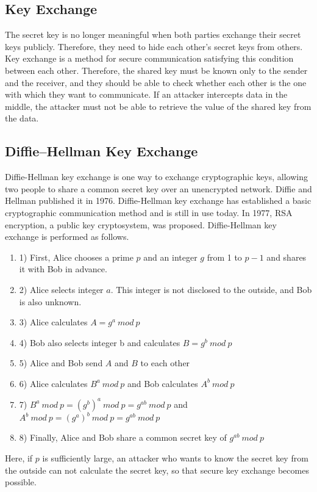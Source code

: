 \documentclass[a4paper]{article}
\begin{document}
\subsection{Key Exchange}
The secret key is no longer meaningful when both parties exchange their secret keys publicly.
Therefore, they need to hide each other's secret keys from others. Key exchange is a method for secure communication satisfying this condition between each other. Therefore, the shared key must be known only to the sender and the receiver, and they should be able to check whether each other is the one with which they want to communicate. If an attacker intercepts data in the middle, the attacker must not be able to retrieve the value of the shared key from the data.

\subsection{Diffie–Hellman Key Exchange}
Diffie-Hellman key exchange \cite{diffie} is one way to exchange cryptographic keys, allowing two people to share a common secret key over an unencrypted network. Diffie and Hellman published it in 1976. Diffie-Hellman key exchange has established a basic cryptographic communication method and is still in use today. In 1977, RSA encryption, a public key cryptosystem, was proposed. Diffie-Hellman key exchange is performed as follows.
\begin{enumerate}[label=]
      \item 1) First, Alice chooses a prime $p$ and an integer $g$ from 1 to $p-1$ and shares it with Bob in advance. 
      
      \item 2) Alice selects integer $a$. This integer is not disclosed to the outside, and Bob is also unknown.
      
      \item 3) Alice calculates $A = g^{a}\ mod\ p$
      \item 4) Bob also selects integer b and calculates $B = g^{b}\ mod\ p$
      \item 5) Alice and Bob send $A$ and $B$ to each other
      \item 6) Alice calculates $B^{a}\ mod\ p$ and Bob calculates $A^{b}\ mod\ p$
      \item 7) $B^a\ mod\ p = (g^b)^a\ mod\ p = g^{ab}\ mod\ p$ and $A^b\ mod\ p = (g^a)^b\ mod\ p = g^{ab}\ mod\ p$
      \item 8) Finally, Alice and Bob share a common secret key of $g^{ab}\ mod\ p$
\end{enumerate}
Here, if $p$ is sufficiently large, an attacker who wants to know the secret key from the outside can not calculate the secret key, so that secure key exchange becomes possible.
\end{document}
